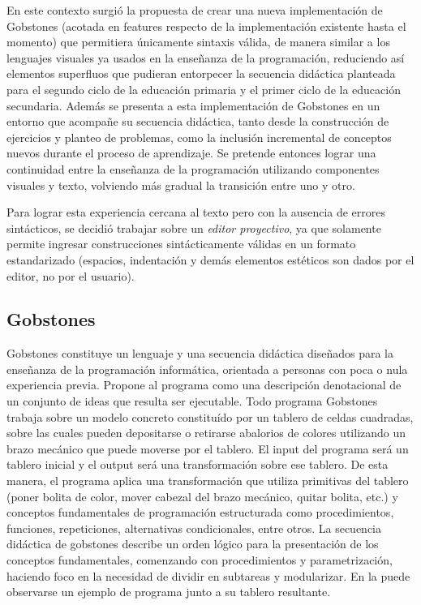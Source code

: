 En este contexto surgió la propuesta de crear una nueva implementación de Gobstones (acotada en features respecto de la implementación existente hasta el momento) que permitiera únicamente sintaxis válida, de manera similar a los lenguajes visuales ya usados en la enseñanza de la programación, reduciendo así elementos superfluos que pudieran entorpecer la secuencia didáctica planteada para el segundo ciclo de la educación primaria y el primer ciclo de la educación secundaria.
Además se presenta a esta implementación de Gobstones en un entorno que acompañe su secuencia didáctica, tanto desde la construcción de ejercicios y planteo de problemas, como la inclusión incremental de conceptos nuevos durante el proceso de aprendizaje. Se pretende entonces lograr una continuidad entre la enseñanza de la programación utilizando componentes visuales y texto, volviendo más gradual la transición entre uno y otro.

Para lograr esta experiencia cercana al texto pero con la ausencia de errores sintácticos, se decidió trabajar sobre un \emph{editor proyectivo}, ya que solamente permite ingresar construcciones sintácticamente válidas en un formato estandarizado (espacios, indentación y demás elementos estéticos son dados por el editor, no por el usuario).

\subsection{Gobstones}

Gobstones constituye un lenguaje y una secuencia didáctica diseñados para la enseñanza de la programación informática, orientada a personas con poca o nula experiencia previa. Propone al programa como una descripción denotacional de un conjunto de ideas que resulta ser ejecutable.
Todo programa Gobstones trabaja sobre un modelo concreto constituído por un tablero de celdas cuadradas, sobre las cuales pueden depositarse o retirarse abalorios de colores utilizando un brazo mecánico que puede moverse por el tablero. El input del programa será un tablero inicial y el output será una transformación sobre ese tablero. De esta manera, el programa aplica una transformación que utiliza primitivas del tablero (poner bolita de color, mover cabezal del brazo mecánico, quitar bolita, etc.) y conceptos fundamentales de programación estructurada como procedimientos, funciones, repeticiones, alternativas condicionales, entre otros.
La secuencia didáctica de gobstones describe un orden lógico para la presentación de los conceptos fundamentales, comenzando con procedimientos y parametrización, haciendo foco en la necesidad de dividir en subtareas y modularizar. En la  puede observarse un ejemplo de programa junto a su tablero resultante.

